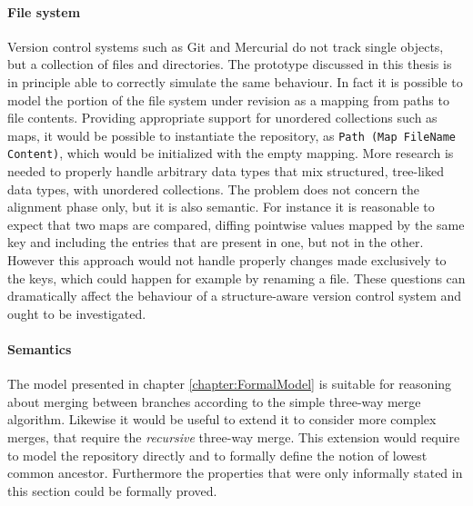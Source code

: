 \documentclass[../Thesis.tex]{subfiles}
\begin{document}
	\paragraph{File system}
	Version control systems such as Git \cite{GIT} and Mercurial 
	\cite{Mercurial} do not track single objects, but a collection of files and 
	directories. The prototype discussed in this thesis is in principle able
	to correctly simulate the same behaviour. In fact it is possible to
	model the portion of the file system under revision as a mapping
	from paths to file contents. Providing appropriate support 
	for unordered collections such as maps, it would be 
	possible to instantiate the repository, 
	as \texttt{Path (Map FileName Content)}, which would be initialized
	with the empty mapping.
	More research is needed to properly handle arbitrary data types that 
	mix structured, tree-liked data types, with unordered collections.
	The problem does not concern the alignment phase only, but it is 
	also semantic.
	For instance it is reasonable to expect that two maps are compared,
	diffing pointwise values mapped by the same key and including
	the entries that are present in one, but not in the other.
	However this approach would not handle properly changes made
	exclusively to the keys, which could happen for example 
	by renaming a file.
	These questions can dramatically affect the behaviour of a 
	structure-aware version control	system and ought to be investigated.

	\paragraph{Semantics}
	The model presented in chapter \ref{chapter:FormalModel} 
	is suitable for reasoning about merging between branches according to
	the simple three-way merge algorithm.
	Likewise it would be useful to extend it to consider
	more complex merges, that require the \emph{recursive} three-way merge.
	This extension would require to model the repository directly and
	to formally define the notion of lowest common ancestor.
	Furthermore the properties that were only informally 
	stated in this section could be formally proved.
	
%	
% 	
\end{document}
